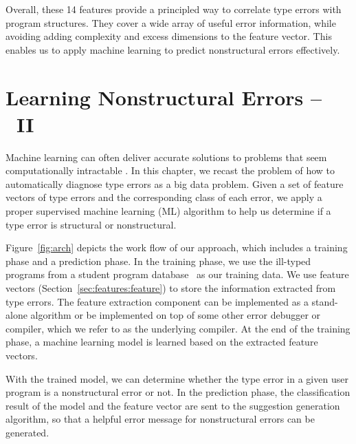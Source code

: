 \documentclass[12pt]{report}	%
\begin{document}
%
Overall, these 14 features provide a 
principled way to correlate type errors with
program structures.
They cover a wide array of useful error information, 
while avoiding adding complexity and 
excess dimensions to the feature vector.
This enables us to apply machine learning
to predict nonstructural errors effectively.

\chapter{Learning Nonstructural Errors -- \newCompiler\ II}
\label{sec:solution}

Machine learning can often deliver accurate solutions to problems
that seem computationally intractable \cite{Moitra14:AAML,Harmeling00solvingsatisfiability}.
In this chapter, we recast the problem of how to automatically diagnose type errors as a big data problem.
Given a set of feature vectors of type errors and the corresponding class of each error,
we apply a proper supervised machine learning (ML) algorithm to help us 
determine if a type error is structural or nonstructural.


Figure~\ref{fig:arch} depicts the work flow of our approach, 
which includes a training phase and a prediction phase.
%
In the training phase, 
we use the ill-typed programs from a student program database~\cite{Hage09:Neon} 
as our training data. 
We use feature vectors (Section~\ref{sec:features:feature}) to store the information extracted from type errors.
The feature extraction component
can be implemented as a stand-alone algorithm or be implemented
on top of some other error debugger or compiler, which we refer to as the
underlying compiler. 
At the end of the training phase,
a machine learning model is learned 
based on the extracted feature vectors.

With the trained model, 
we can determine whether 
the type error in a given user program
is a nonstructural error or not.
In the prediction phase,
the classification result of the model
and the feature vector are sent to the
suggestion generation algorithm, 
so that a helpful error message
for nonstructural errors
can be generated.
\end{document}
